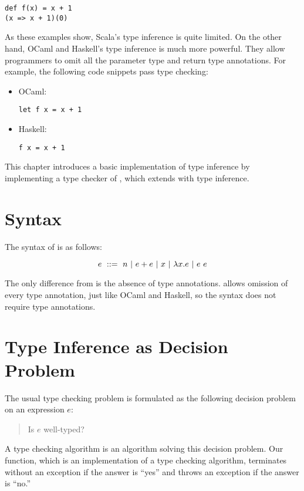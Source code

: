 \begin{verbatim}
def f(x) = x + 1
(x => x + 1)(0)
\end{verbatim}

As these examples show, Scala's type inference is quite limited. On the other
hand, OCaml and Haskell's type inference is much more powerful. They allow
programmers to omit all the parameter type and return type annotations. For
example, the following code snippets pass type checking:

\begin{itemize}
  \item OCaml:
    \begin{verbatim}
let f x = x + 1
    \end{verbatim}
  \item Haskell:
    \begin{verbatim}
f x = x + 1
    \end{verbatim}
\end{itemize}

This chapter introduces a basic implementation of type inference by implementing a
type checker of \lang, which extends \plang with type inference.

\section{Syntax}

The syntax of \lang is as follows:

\[
e\ ::=\ n
\ |\ e+e
\ |\ x
\ |\ \lambda x.e
\ |\ e\ e
\]

The only difference from \plang is the absence of type annotations. \lang allows
omission of every type annotation, just like OCaml and Haskell, so the syntax
does not require type annotations.

\section{Type Inference as Decision Problem}

The usual type checking problem is formulated as the following decision problem
on an expression $e$:

\begin{quote}
  Is $e$ well-typed?
\end{quote}

A type checking algorithm is an algorithm solving this decision problem. Our
 function, which is an implementation of a type checking
algorithm, terminates without an exception if the answer is ``yes'' and throws
an exception if the answer is ``no.''

